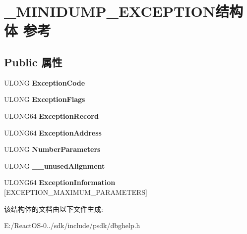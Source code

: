\hypertarget{struct___m_i_n_i_d_u_m_p___e_x_c_e_p_t_i_o_n}{}\section{\+\_\+\+M\+I\+N\+I\+D\+U\+M\+P\+\_\+\+E\+X\+C\+E\+P\+T\+I\+O\+N结构体 参考}
\label{struct___m_i_n_i_d_u_m_p___e_x_c_e_p_t_i_o_n}
\subsection*{Public 属性}
\begin{DoxyCompactItemize}
\item 
\mbox{\label{struct___m_i_n_i_d_u_m_p___e_x_c_e_p_t_i_o_n_a61e82820f97789653b3d745eb018250b}} 
U\+L\+O\+NG {\bfseries Exception\+Code}
\item 
\mbox{\label{struct___m_i_n_i_d_u_m_p___e_x_c_e_p_t_i_o_n_a7f1878cbf47510c89961c9f763d11dd9}} 
U\+L\+O\+NG {\bfseries Exception\+Flags}
\item 
\mbox{\label{struct___m_i_n_i_d_u_m_p___e_x_c_e_p_t_i_o_n_a3ffc3cd81fc735907cd38a6bf3fe9117}} 
U\+L\+O\+N\+G64 {\bfseries Exception\+Record}
\item 
\mbox{\label{struct___m_i_n_i_d_u_m_p___e_x_c_e_p_t_i_o_n_ad2416b17e1b2bfbd241adfb8c7910234}} 
U\+L\+O\+N\+G64 {\bfseries Exception\+Address}
\item 
\mbox{\label{struct___m_i_n_i_d_u_m_p___e_x_c_e_p_t_i_o_n_ab525902d55fbc3d06dcbd5881c182bfd}} 
U\+L\+O\+NG {\bfseries Number\+Parameters}
\item 
\mbox{\label{struct___m_i_n_i_d_u_m_p___e_x_c_e_p_t_i_o_n_a5ce3b6d69a71eb117427e9d08ed3d3b5}} 
U\+L\+O\+NG {\bfseries \+\_\+\+\_\+unused\+Alignment}
\item 
\mbox{\label{struct___m_i_n_i_d_u_m_p___e_x_c_e_p_t_i_o_n_af3b50c39d4dae285a819bdbcca98b437}} 
U\+L\+O\+N\+G64 {\bfseries Exception\+Information} \mbox{[}E\+X\+C\+E\+P\+T\+I\+O\+N\+\_\+\+M\+A\+X\+I\+M\+U\+M\+\_\+\+P\+A\+R\+A\+M\+E\+T\+E\+RS\mbox{]}
\end{DoxyCompactItemize}


该结构体的文档由以下文件生成\+:\begin{DoxyCompactItemize}
\item 
E\+:/\+React\+O\+S-\/0../sdk/include/psdk/dbghelp.\+h\end{DoxyCompactItemize}
